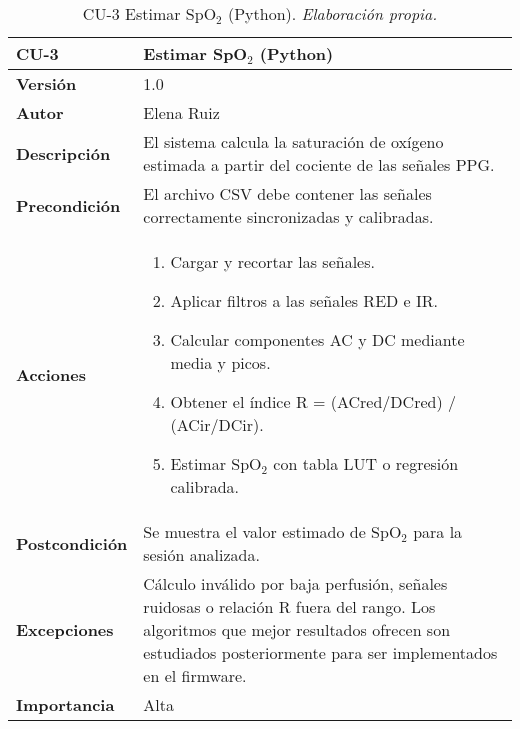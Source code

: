 \begin{table}[H]
	\centering
	\begin{tabularx}{\linewidth}{ p{} p{} }
		\toprule
		\textbf{CU-3}    & \textbf{Estimar SpO$_2$ (Python)} \\
		\toprule
		\textbf{Versión}              & 1.0 \\
		\textbf{Autor}                & Elena Ruiz \\
		\textbf{Descripción}          & El sistema calcula la saturación de oxígeno estimada a partir del cociente de las señales PPG. \\
		\textbf{Precondición}         & El archivo CSV debe contener las señales correctamente sincronizadas y calibradas. \\
		\textbf{Acciones}             &
		\begin{enumerate}
			\item Cargar y recortar las señales.
			\item Aplicar filtros a las señales RED e IR.
			\item Calcular componentes AC y DC mediante media y picos.
			\item Obtener el índice R = (ACred/DCred) / (ACir/DCir).
			\item Estimar SpO$_2$ con tabla LUT o regresión calibrada.
		\end{enumerate} \\
		\textbf{Postcondición}        & Se muestra el valor estimado de SpO$_2$ para la sesión analizada. \\
		\textbf{Excepciones}          & Cálculo inválido por baja perfusión, señales ruidosas o relación R fuera del rango. Los algoritmos que mejor resultados ofrecen son estudiados posteriormente para ser implementados en el firmware. \\
		\textbf{Importancia}          & Alta \\
		\bottomrule
	\end{tabularx}
	\caption{CU-3 Estimar SpO$_2$ (Python). \textit{Elaboración propia.}}
\end{table}

